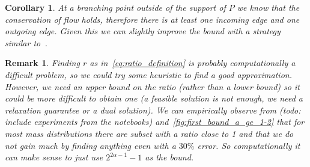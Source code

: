 \documentclass[11pt,reqno,a4paper]{amsart}
\numberwithin{equation}{section}
\theoremstyle{mytheorem}
\newtheorem{corollary}[subsection]{Corollary}
\theoremstyle{myremark}
\newtheorem{remark}[subsection]{Remark}
\theoremstyle{myparagraph}
\begin{document}
    \begin{corollary}
        At a branching point outside of the support of $P$ we know that the conservation of flow holds, therefore there is
        at least one incoming edge and one outgoing edge. Given this we can slightly improve the bound with a strategy
        similar to~\cite[Section 11]{Bernot}.

    \end{corollary}
    \begin{remark}
        Finding $r$ as in~\ref{eq:ratio_definition} is probably computationally a difficult problem, so we could try some heuristic to find a good approximation.
        However, we need an upper bound on the ratio (rather than a lower bound) so it could be more difficult to obtain one (a feasible solution is
        not enough, we need a relaxation guarantee or a dual solution). We can empirically observe from
        (todo: include experiments from the notebooks) and~\ref{fig:first_bound_a_ge_1-2} that for most mass distributions there are subset with a ratio
        close to 1 and that we do not gain much by finding anything even with a $30\%$ error.
        So computationally it can make sense to just use $2^{2\alpha - 1} - 1$ as the bound.
    \end{remark}
\end{document}
